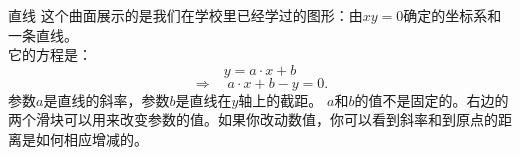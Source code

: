 ﻿
\begin{surferPage}[Line]{直线}
这个曲面展示的是我们在学校里已经学过的图形：由$xy=0$确定的坐标系和一条直线。\\它的方程是：
\[y=a\cdot x + b\]
\[ \Rightarrow \quad a\cdot x +b -y=0.\]
参数$a$是直线的斜率，参数$b$是直线在$y$轴上的截距。
\newline \newline
$a$和$b$的值不是固定的。右边的两个滑块可以用来改变参数的值。如果你改动数值，你可以看到斜率和到原点的距离是如何相应增减的。
\end{surferPage}

